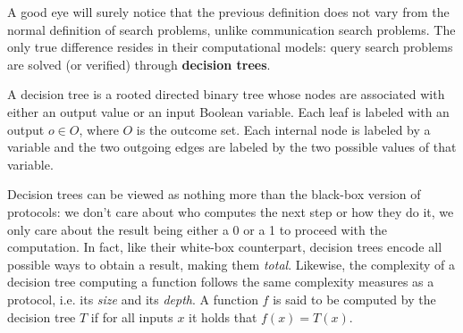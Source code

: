 A good eye will surely notice that the previous definition does not vary from the normal definition of search problems, unlike communication search problems. The only true difference resides in their computational models: query search problems are solved (or verified) through \textbf{decision trees}.

\begin{definition}
 A decision tree is a rooted directed binary tree whose nodes are associated with either an output value or an input Boolean variable. Each leaf is labeled with an output $o \in O$, where $O$ is the outcome set. Each internal node is labeled by a variable and the two outgoing edges are labeled by the two possible values of that variable.
\end{definition}

Decision trees can be viewed as nothing more than the black-box version of protocols: we don't care about who computes the next step or how they do it, we only care about the result being either a 0 or a 1 to proceed with the computation. In fact, like their white-box counterpart, decision trees encode all possible ways to obtain a result, making them \textit{total}. Likewise, the complexity of a decision tree computing a function follows the same complexity measures as a protocol, i.e. its \textit{size} and its \textit{depth}. A function $f$ is said to be computed by the decision tree $T$ if for all inputs $x$ it holds that $f(x) = T(x)$. 

